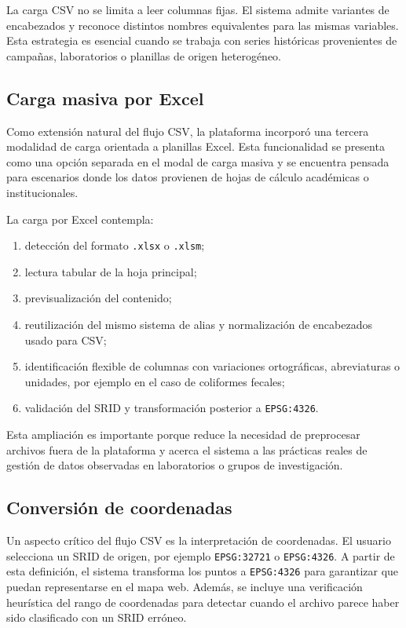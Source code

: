 \documentclass[12pt,a4paper]{report}
\begin{document}
La carga CSV no se limita a leer columnas fijas. El sistema admite variantes de encabezados y reconoce distintos nombres equivalentes para las mismas variables. Esta estrategia es esencial cuando se trabaja con series hist\'oricas provenientes de campa\~nas, laboratorios o planillas de origen heterog\'eneo.

\subsection{Carga masiva por Excel}

Como extensi\'on natural del flujo CSV, la plataforma incorpor\'o una tercera modalidad de carga orientada a planillas Excel. Esta funcionalidad se presenta como una opci\'on separada en el modal de carga masiva y se encuentra pensada para escenarios donde los datos provienen de hojas de c\'alculo acad\'emicas o institucionales.

La carga por Excel contempla:

\begin{enumerate}
    \item detecci\'on del formato \texttt{.xlsx} o \texttt{.xlsm};
    \item lectura tabular de la hoja principal;
    \item previsualizaci\'on del contenido;
    \item reutilizaci\'on del mismo sistema de alias y normalizaci\'on de encabezados usado para CSV;
    \item identificaci\'on flexible de columnas con variaciones ortogr\'aficas, abreviaturas o unidades, por ejemplo en el caso de coliformes fecales;
    \item validaci\'on del SRID y transformaci\'on posterior a \texttt{EPSG:4326}.
\end{enumerate}

Esta ampliaci\'on es importante porque reduce la necesidad de preprocesar archivos fuera de la plataforma y acerca el sistema a las pr\'acticas reales de gesti\'on de datos observadas en laboratorios o grupos de investigaci\'on.

\subsection{Conversi\'on de coordenadas}

Un aspecto cr\'itico del flujo CSV es la interpretaci\'on de coordenadas. El usuario selecciona un SRID de origen, por ejemplo \texttt{EPSG:32721} o \texttt{EPSG:4326}. A partir de esta definici\'on, el sistema transforma los puntos a \texttt{EPSG:4326} para garantizar que puedan representarse en el mapa web. Adem\'as, se incluye una verificaci\'on heur\'istica del rango de coordenadas para detectar cuando el archivo parece haber sido clasificado con un SRID err\'oneo.
\end{document}
